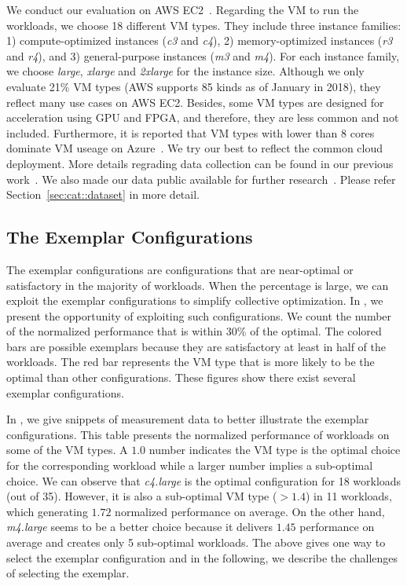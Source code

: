 We conduct our evaluation on AWS EC2~\cite{aws}.
Regarding the VM to run the workloads, we choose 18 different VM types.
They include three instance families:
1) compute-optimized instances (\emph{c3} and \emph{c4}),
2) memory-optimized instances (\emph{r3} and \emph{r4}), and
3) general-purpose instances (\emph{m3} and \emph{m4}).
For each instance family, we choose \emph{large}, \emph{xlarge} and \emph{2xlarge} for the instance size.
Although we only evaluate 21\% VM types (AWS supports 85 kinds as of January in 2018),
they reflect many use cases on AWS EC2.
Besides, some VM types are designed for acceleration using GPU and FPGA, and therefore, they are less common and not included.
Furthermore, it is reported that VM types with lower than 8 cores dominate VM useage on Azure~\cite{Cortez2017}.
We try our best to reflect the common cloud deployment.
More details regrading data collection can be found in our previous work~\cite{Hsu2018Arrow, Hsu2018Scout}.
We also made our data public available for further research~\cite{scoutdataset}.
Please refer Section~\ref{sec:cat::dataset} in more detail.



\subsection{The Exemplar Configurations}
\label{sec:exemplar}
The exemplar configurations are configurations that
are near-optimal or satisfactory in the majority of workloads.
When the percentage is large, 
we can exploit the exemplar configurations to simplify collective optimization.
In \myfigure{\ref{fig:motivation_percentage}}, we present the opportunity of exploiting such configurations.
We count the number of the normalized performance that is within 30\% of the optimal.
The colored bars are possible exemplars because they are satisfactory at least in half of the workloads.
The red bar represents the VM type that is more likely to be the optimal than other configurations.
These figures show there exist several exemplar configurations.


% 

In \mytable{\ref{table:dataset}}, we give snippets of measurement data to better illustrate the exemplar configurations.
This table presents the normalized performance of workloads on some of the VM types.
A $1.0$ number indicates the VM type is the optimal choice for the corresponding workload while a larger number implies a sub-optimal choice.
We can observe that \emph{c4.large} is the optimal configuration for 18 workloads (out of 35).
However, it is also a sub-optimal VM type ($>1.4$) in 11 workloads, which generating
$1.72$ normalized performance on average.
On the other hand, \emph{m4.large} seems to be a better choice because it delivers $1.45$ performance on average and creates only 5 sub-optimal workloads.
The above gives one way to select the exemplar configuration and in the following,
we describe the challenges of selecting the exemplar.



